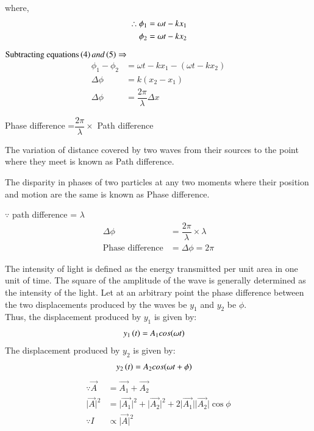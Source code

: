 \documentclass[journal,12pt,twocolumn]{IEEEtran}
\theoremstyle{remark}
\begin{document}
where,
\begin{align}
 \therefore \phi_1 &= \omega t - kx_1 \\
\hspace*{0.4cm} \phi_2 &= \omega t - kx_2 
\end{align}

$ \text{Subtracting equations}\left(4\right) and \left(5\right)  \Rightarrow{}$
\begin{align}
   \phi_1 - \phi_2 &= \omega t - kx_1 -( \omega t - kx_2 ) \nonumber \\ 
   \Delta \phi &= k(x_2 - x_1) \nonumber \\ 
    \Delta \phi &= \dfrac{2\pi}{\lambda}\Delta x 
\end{align}

\hspace{0.3cm} Phase difference =$\dfrac{2\pi}{\lambda} \times$ Path difference

\vspace{0.2cm}

The variation of distance covered by two waves from their sources to the point where they meet is known as Path difference.

The disparity in phases of two particles at any two moments where their position and motion are the same is known as Phase difference.

$\because$ path difference = $\lambda$
\begin{align}
\Delta \phi &= \dfrac{2\pi}{\lambda}  \times \lambda \nonumber \\
\text{Phase difference} &= \Delta \phi = 2\pi
\end{align}

The intensity of light is defined as the energy transmitted per unit area in one unit of time. The square of the amplitude of the wave is generally determined as the intensity of the light. 
Let at an arbitrary point the phase difference between the two displacements produced by the waves be $y_1$ and $y_2$ be $\phi$.\\
Thus, the displacement produced by $y_1$ is given by:\
\begin{align}
    y_1\left(t\right) &= A_1cos(\omega t )
\end{align}
The displacement produced by $y_2$ is given by:
\begin{align}
    y_2\left(t\right) &= A_2cos(\omega t + \phi)
\end{align}
\begin{align}
 \because \overrightarrow{A} &= \overrightarrow{A_1} + \overrightarrow{A_2} \nonumber \\
 \lvert \overrightarrow{A} \rvert^2 &= \lvert\overrightarrow{A_1}\rvert^2 +\lvert \overrightarrow{A_2}\rvert^2 + 2\lvert\overrightarrow{A_1}\rvert\lvert\overrightarrow{A_2}\rvert \cos \phi  \\
\because I &\propto \lvert\overrightarrow{A}\rvert^2 
\end{align}
\end{document}
